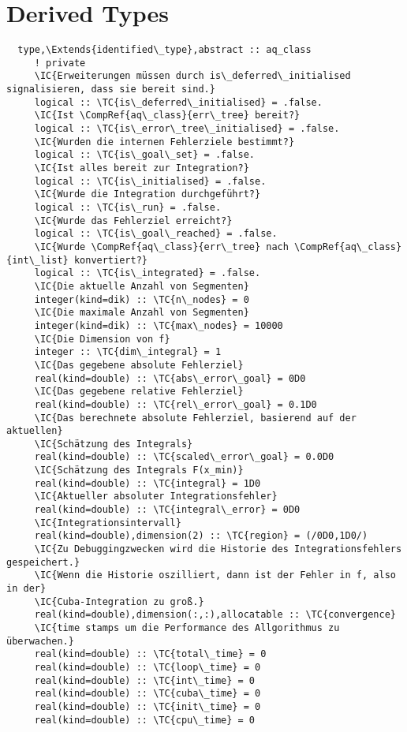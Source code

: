 \section{Derived Types}
\begin{Verbatim}
  type,\Extends{identified\_type},abstract :: aq_class
     ! private
     \IC{Erweiterungen müssen durch is\_deferred\_initialised signalisieren, dass sie bereit sind.}
     logical :: \TC{is\_deferred\_initialised} = .false.
     \IC{Ist \CompRef{aq\_class}{err\_tree} bereit?}
     logical :: \TC{is\_error\_tree\_initialised} = .false.
     \IC{Wurden die internen Fehlerziele bestimmt?}
     logical :: \TC{is\_goal\_set} = .false.
     \IC{Ist alles bereit zur Integration?}
     logical :: \TC{is\_initialised} = .false.
     \IC{Wurde die Integration durchgeführt?}
     logical :: \TC{is\_run} = .false.
     \IC{Wurde das Fehlerziel erreicht?}
     logical :: \TC{is\_goal\_reached} = .false.
     \IC{Wurde \CompRef{aq\_class}{err\_tree} nach \CompRef{aq\_class}{int\_list} konvertiert?}
     logical :: \TC{is\_integrated} = .false.
     \IC{Die aktuelle Anzahl von Segmenten}
     integer(kind=dik) :: \TC{n\_nodes} = 0
     \IC{Die maximale Anzahl von Segmenten}
     integer(kind=dik) :: \TC{max\_nodes} = 10000
     \IC{Die Dimension von f}
     integer :: \TC{dim\_integral} = 1
     \IC{Das gegebene absolute Fehlerziel}
     real(kind=double) :: \TC{abs\_error\_goal} = 0D0
     \IC{Das gegebene relative Fehlerziel}
     real(kind=double) :: \TC{rel\_error\_goal} = 0.1D0
     \IC{Das berechnete absolute Fehlerziel, basierend auf der aktuellen}
     \IC{Schätzung des Integrals}
     real(kind=double) :: \TC{scaled\_error\_goal} = 0.0D0
     \IC{Schätzung des Integrals F(x_min)}
     real(kind=double) :: \TC{integral} = 1D0
     \IC{Aktueller absoluter Integrationsfehler}
     real(kind=double) :: \TC{integral\_error} = 0D0
     \IC{Integrationsintervall}
     real(kind=double),dimension(2) :: \TC{region} = (/0D0,1D0/)
     \IC{Zu Debuggingzwecken wird die Historie des Integrationsfehlers gespeichert.}
     \IC{Wenn die Historie oszilliert, dann ist der Fehler in f, also in der}
     \IC{Cuba-Integration zu groß.}
     real(kind=double),dimension(:,:),allocatable :: \TC{convergence}
     \IC{time stamps um die Performance des Allgorithmus zu überwachen.}
     real(kind=double) :: \TC{total\_time} = 0
     real(kind=double) :: \TC{loop\_time} = 0
     real(kind=double) :: \TC{int\_time} = 0
     real(kind=double) :: \TC{cuba\_time} = 0
     real(kind=double) :: \TC{init\_time} = 0
     real(kind=double) :: \TC{cpu\_time} = 0


\end{Verbatim}
